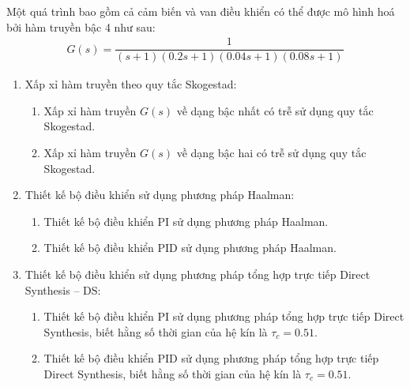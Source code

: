 \begin{exercise}
    Một quá trình bao gồm cả cảm biến và van điều khiển có thể được mô hình hoá bởi hàm truyền bậc 4 như sau:
        \begin{align*}
            G(s) = \dfrac{1}{(s + 1)(0.2s + 1)(0.04s+1)(0.08s+1)}
        \end{align*}
    \begin{enumerate}
        \item Xấp xỉ hàm truyền theo quy tắc Skogestad:
            \begin{enumerate}
                \item Xấp xỉ hàm truyền $G(s)$ về dạng bậc nhất có trễ sử dụng quy tắc Skogestad.
                \item Xấp xỉ hàm truyền $G(s)$ về dạng bậc hai có trễ sử dụng quy tắc Skogestad.
            \end{enumerate}

        \item Thiết kế bộ điều khiển sử dụng phương pháp Haalman:
            \begin{enumerate}
                \item Thiết kế bộ điều khiển PI sử dụng phương pháp Haalman.
                \item Thiết kế bộ điều khiển PID sử dụng phương pháp Haalman.
            \end{enumerate}

        \item Thiết kế bộ điều khiển sử dụng phương pháp tổng hợp trực tiếp Direct Synthesis -- DS:
            \begin{enumerate}
                \item Thiết kế bộ điều khiển PI sử dụng phương pháp tổng hợp trực tiếp Direct Synthesis, biết hằng số thời gian của hệ kín là $\tau_c = 0.51$.

                \item Thiết kế bộ điều khiển PID sử dụng phương pháp tổng hợp trực tiếp Direct Synthesis, biết hằng số thời gian của hệ kín là $\tau_c = 0.51$.
            \end{enumerate}
    \end{enumerate}
\end{exercise}
